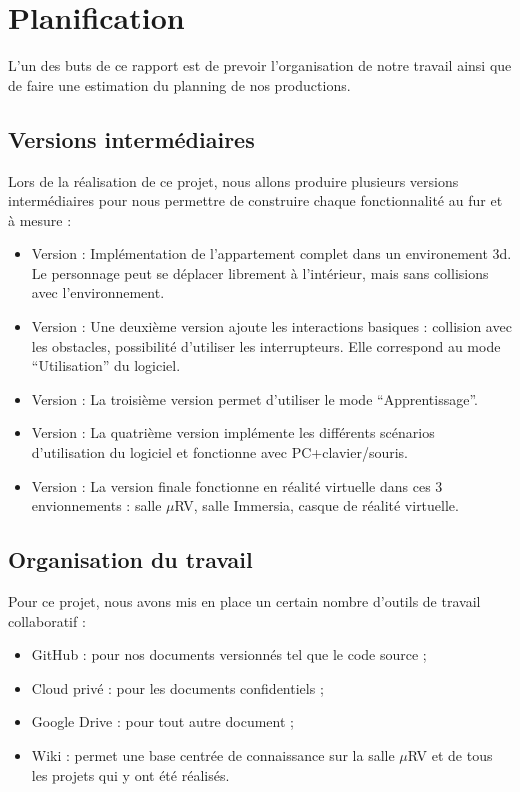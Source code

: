 \section{Planification}

L'un des buts de ce rapport est de prevoir l'organisation de notre travail ainsi que de faire une estimation du planning de nos productions.

\subsection{Versions intermédiaires}
Lors de la réalisation de ce projet, nous allons produire plusieurs versions intermédiaires pour nous permettre de construire chaque fonctionnalité au fur et à mesure :
\begin{itemize}
  \item Version  : Implémentation de l'appartement complet dans un environement 3d. Le personnage peut se déplacer librement à l'intérieur, mais sans collisions avec l'environnement.
  \item Version  : Une deuxième version ajoute les interactions basiques : collision avec les obstacles, possibilité d'utiliser les interrupteurs. Elle correspond au mode \enquote{Utilisation} du logiciel.
  \item Version  : La troisième version permet d'utiliser le mode \enquote{Apprentissage}.
  \item Version  : La quatrième version implémente les différents scénarios d'utilisation du logiciel et fonctionne avec PC+clavier/souris.
  \item Version  : La version finale fonctionne en réalité virtuelle dans ces 3 envionnements : salle $\mu$RV, salle Immersia, casque de réalité virtuelle.
\end{itemize}

\subsection{Organisation du travail}
Pour ce projet, nous avons mis en place un certain nombre d'outils de travail collaboratif :

\begin{itemize}
  \item GitHub : pour nos documents versionnés tel que le code source ;
  \item Cloud privé : pour les documents confidentiels ;
  \item Google Drive : pour tout autre document ;
  \item Wiki : permet une base centrée de connaissance sur la salle $\mu$RV et de tous les projets qui y ont été réalisés.
\end{itemize}


